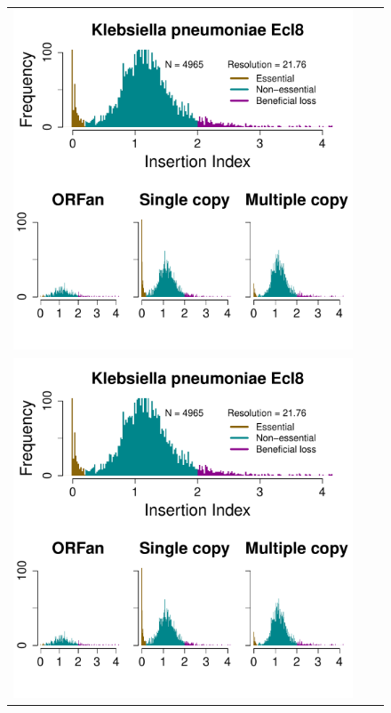 \documentclass[a4paper,10pt, twocolumn]{article}
\begin{document}
\begin{figure}
\begin{tabular}{c c c}
\includegraphics[page=9, scale=0.28]{per-species-insertion-index.pdf} \\
\includegraphics[page=10, scale=0.28]{per-species-insertion-index.pdf} &

\end{tabular}
\end{figure}
\end{document}
